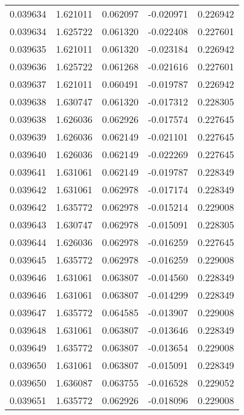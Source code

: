 \begin{tabular}{lrrrr}
0.039634    &  1.621011 &  0.062097 & -0.020971 &             0.226942 \\
0.039634    &  1.625722 &  0.061320 & -0.022408 &             0.227601 \\
0.039635    &  1.621011 &  0.061320 & -0.023184 &             0.226942 \\
0.039636    &  1.625722 &  0.061268 & -0.021616 &             0.227601 \\
0.039637    &  1.621011 &  0.060491 & -0.019787 &             0.226942 \\
0.039638    &  1.630747 &  0.061320 & -0.017312 &             0.228305 \\
0.039638    &  1.626036 &  0.062926 & -0.017574 &             0.227645 \\
0.039639    &  1.626036 &  0.062149 & -0.021101 &             0.227645 \\
0.039640    &  1.626036 &  0.062149 & -0.022269 &             0.227645 \\
0.039641    &  1.631061 &  0.062149 & -0.019787 &             0.228349 \\
0.039642    &  1.631061 &  0.062978 & -0.017174 &             0.228349 \\
0.039642    &  1.635772 &  0.062978 & -0.015214 &             0.229008 \\
0.039643    &  1.630747 &  0.062978 & -0.015091 &             0.228305 \\
0.039644    &  1.626036 &  0.062978 & -0.016259 &             0.227645 \\
0.039645    &  1.635772 &  0.062978 & -0.016259 &             0.229008 \\
0.039646    &  1.631061 &  0.063807 & -0.014560 &             0.228349 \\
0.039646    &  1.631061 &  0.063807 & -0.014299 &             0.228349 \\
0.039647    &  1.635772 &  0.064585 & -0.013907 &             0.229008 \\
0.039648    &  1.631061 &  0.063807 & -0.013646 &             0.228349 \\
0.039649    &  1.635772 &  0.063807 & -0.013654 &             0.229008 \\
0.039650    &  1.631061 &  0.063807 & -0.015091 &             0.228349 \\
0.039650    &  1.636087 &  0.063755 & -0.016528 &             0.229052 \\
0.039651    &  1.635772 &  0.062926 & -0.018096 &             0.229008 \\

\end{tabular}
